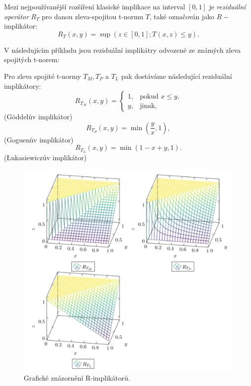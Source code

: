 Mezi nejpoužívanější rozšíření klasické implikace na interval $[0,1]$ je \textit{reziduální operátor} $R_T$ pro danou zleva-spojitou t-normu $T$, také označován jako $R-$implikátor: $$ R_T(x,y)=\sup(z \in [0,1]; T(x,z) \leq y).$$

V následujícím příkladu jsou rezidu\'aln\'i implik\'atry odvozen\'e ze zn\'am\'ych zleva spojit\'ych t-norem:
\begin{example} Pro zleva spojité t-normy $T_M, T_P$ a $T_L$ pak dostáváme  následující reziduální implikátory:
    \cite{Springer}\\
     $$ R_{T_M}(x,y)=\begin{cases} 1, &\mbox {pokud $x\leq y$,} \\y, &\mbox{jinak,} \end{cases} $$
    (Göddel\r uv implik\' ator)
     $$ R_{T_P}(x,y)=\min \left (\frac yx,1 \right ),$$
    (Goguen\r uv implikátor)
     $$ R_{T_L}(x,y)=\min(1-x+y,1).$$
    (\L{}ukasiewicz\r uv implikátor)\\
\end{example}

     
\begin{figure}[H]
\caption{Grafické znázornění R-implikátor\r u.\\}
                \hspace{-1cm}
                \includegraphics[scale=0.60]{template-fig/impl4.pdf}
                \centering
            \end{figure}



